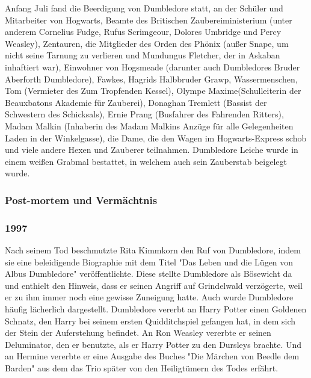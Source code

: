 \documentclass[a4paper, 10pt]{article}
\begin{document}
\vspace{10pt}
\newline
Anfang Juli fand die Beerdigung von Dumbledore statt, an der Schüler und Mitarbeiter von Hogwarts, Beamte des Britischen Zaubereiministerium (unter anderem Cornelius Fudge, Rufus Scrimgeour, Dolores Umbridge und Percy Weasley), Zentauren, die Mitglieder des Orden des Phönix (außer Snape, um nicht seine Tarnung zu verlieren und Mundungus Fletcher, der in Askaban inhaftiert war), Einwohner von Hogsmeade (darunter auch Dumbledores Bruder Aberforth Dumbledore), Fawkes, Hagrids Halbbruder Grawp, Wassermenschen, Tom (Vermieter des Zum Tropfenden Kessel), Olympe Maxime(Schulleiterin der Beauxbatons Akademie für Zauberei), Donaghan Tremlett (Bassist der Schwestern des Schicksals), Ernie Prang (Busfahrer des Fahrenden Ritters), Madam Malkin (Inhaberin des Madam Malkins Anzüge für alle Gelegenheiten Laden in der Winkelgasse), die Dame, die den Wagen im Hogwarts-Express schob und viele andere Hexen und Zauberer teilnahmen. Dumbledore Leiche wurde in einem weißen Grabmal bestattet, in welchem auch sein Zauberstab beigelegt wurde.

\subsubsection*{Post-mortem und Vermächtnis}
\subsubsection*{1997}
Nach seinem Tod beschmutzte Rita Kimmkorn den Ruf von Dumbledore, indem sie eine beleidigende Biographie mit dem Titel "Das Leben und die Lügen von Albus Dumbledore" veröffentlichte. Diese stellte Dumbledore als Bösewicht da und enthielt den Hinweis, dass er seinen Angriff auf Grindelwald verzögerte, weil er zu ihm immer noch eine gewisse Zuneigung hatte. Auch wurde Dumbledore häufig lächerlich dargestellt.
\vspace{10pt}
\newline
Dumbledore vererbt an Harry Potter einen Goldenen Schnatz, den Harry bei seinem ersten Quidditchspiel gefangen hat, in dem sich der Stein der Auferstehung befindet. An Ron Weasley vererbte er seinen Deluminator, den er benutzte, als er Harry Potter zu den Dursleys brachte. Und an Hermine vererbte er eine Ausgabe des Buches "Die Märchen von Beedle dem Barden" aus dem das Trio später von den Heiligtümern des Todes erfährt.
\end{document}
